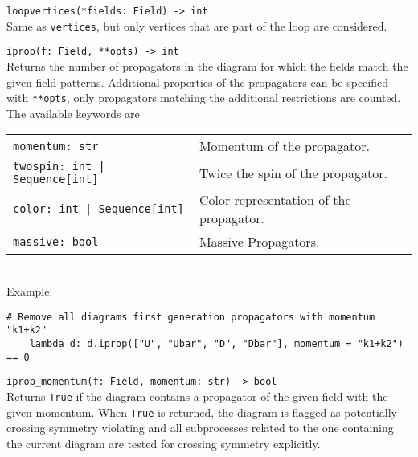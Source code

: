 \begin{basedescript}{\desclabelstyle{\pushlabel}}
   \item[\hspace{-1em}]\colorbox{gray!30}{\lstinline[style=pykw]|loopvertices(*fields: Field) -> int|} \vspace{0.1cm}\\
   Same as \texttt{vertices}, but only vertices that are part of the loop are considered.

   \item[\hspace{-1em}]\colorbox{gray!30}{\lstinline[style=pykw]|iprop(f: Field, **opts) -> int|} \vspace{0.1cm}\\
   Returns the number of propagators in the diagram for which the fields match the given field patterns. Additional properties of the propagators can be specified with \texttt{**opts}, only propagators matching the additional restrictions are counted. The available keywords are \\
   \def\arraystretch{1.5}
   \begin{tabular}{l l}
    \colorbox{gray!30}{\lstinline[style=pykw]|momentum: str|} & Momentum of the propagator. \\
    \colorbox{gray!30}{\lstinline[style=pykw]{twospin: int | Sequence[int]}} & Twice the spin of the propagator. \\
    \colorbox{gray!30}{\lstinline[style=pykw]{color: int | Sequence[int]}} & Color representation of the propagator. \\
    \colorbox{gray!30}{\lstinline[style=pykw]|massive: bool|} & Massive Propagators.
   \end{tabular}
   \def\arraystretch{1.0}
   \vspace{0.2cm} \\
   Example:
   \begin{lstlisting}[style=pykw]
    # Remove all diagrams first generation propagators with momentum "k1+k2"
    lambda d: d.iprop(["U", "Ubar", "D", "Dbar"], momentum = "k1+k2") == 0
   \end{lstlisting}

   \item[\hspace{-1em}]\colorbox{gray!30}{\lstinline[style=pykw]|iprop_momentum(f: Field, momentum: str) -> bool|} \vspace{0.1cm}\\
   Returns \texttt{True} if the diagram contains a propagator of the given field with the given momentum. When \texttt{True} is returned, the diagram is flagged as potentially crossing symmetry violating and all subprocesses related to the one containing the current diagram are tested for crossing symmetry explicitly.


\end{basedescript}
